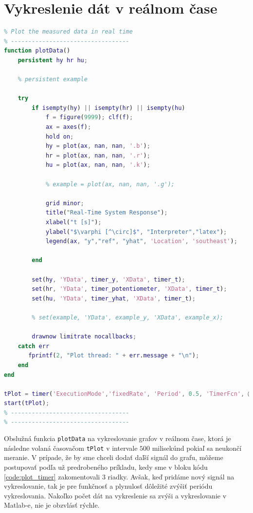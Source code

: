 \documentclass[a4paper, 10pt, ]{article}
\begin{document}
\section{Vykreslenie dát v reálnom čase}
\begin{lstlisting}[caption=Definícia časovača na vykreslenie meraných dát v reálnom čase., label={code:plot_timer}, language=Matlab]
% ----------------------------------
% Plot the measured data in real time
% ----------------------------------
function plotData()
    persistent hy hr hu;
    
    % persistent example
    
    try
        if isempty(hy) || isempty(hr) || isempty(hu)
            f = figure(9999); clf(f);
            ax = axes(f);
            hold on;
            hy = plot(ax, nan, nan, '.b');
            hr = plot(ax, nan, nan, '.r');
            hu = plot(ax, nan, nan, '.k');

            % example = plot(ax, nan, nan, '.g');
            
            grid minor;
            title("Real-Time System Response");
            xlabel("t [s]");
            ylabel("$\varphi [^\circ]$", "Interpreter","latex");
            legend(ax, "y","ref", "yhat", 'Location', 'southeast');
            
        end

        set(hy, 'YData', timer_y, 'XData', timer_t);
        set(hr, 'YData', timer_potentiometer, 'XData', timer_t);
        set(hu, 'YData', timer_yhat, 'XData', timer_t);
        
        % set(example, 'YData', example_y, 'XData', example_x);
        
        drawnow limitrate nocallbacks;
    catch err
       fprintf(2, "Plot thread: " + err.message + "\n");
    end
end

tPlot = timer('ExecutionMode','fixedRate', 'Period', 0.5, 'TimerFcn', @(~, ~) plotData());
start(tPlot);
% ----------------------------------
% ----------------------------------
\end{lstlisting}

Obslužná funkcia \texttt{plotData} na vykreslovanie grafov v reálnom čase, ktorá je následne volaná časovačom \texttt{tPlot} v intervale $500$ milisekúnd pokiaľ sa neukončí meranie. V prípade, že by sme chceli dodať daľší signál do grafu, môžeme postupovať podľa už predrobeného príkladu, kedy sme v bloku kódu \ref{code:plot_timer} zakomentovali $3$ riadky. Avšak, keď pridáme nový signál na vykreslovanie, tak je pre funkčnosť a plynulosť dôležité zvýšiť periódu vykreslovania. Nakoľko počet dát na vykreslenie sa zvýši a vykreslovanie v Matlab-e, nie je obzvlásť rýchle.
\end{document}
